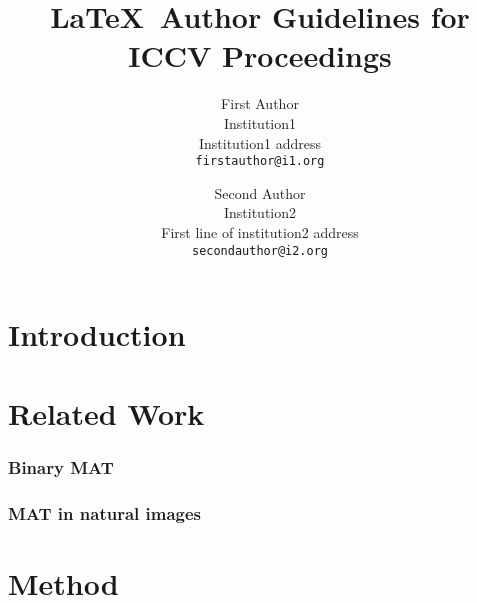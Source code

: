 \documentclass[10pt,twocolumn,letterpaper]{article}
\begin{document}
\title{\LaTeX\ Author Guidelines for ICCV Proceedings}

\author{First Author\\
Institution1\\
Institution1 address\\
{\tt\small firstauthor@i1.org}
\and
Second Author\\
Institution2\\
First line of institution2 address\\
{\tt\small secondauthor@i2.org}
}

\maketitle


\begin{abstract}
\end{abstract}

\section{Introduction}\label{sec:introduction}

\section{Related Work}\label{sec:related}
\subsubsection{Binary MAT}
\subsubsection{MAT in natural images}

\section{Method}\label{sec:method}
\end{document}

